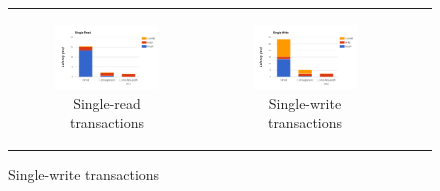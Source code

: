 \begin{figure}
  \centering
  \begin{tabular}{cccc}
    
  \begin{subfigure}[t]{0.4\textwidth}
	\includegraphics[width=\textwidth]{figs/stack-brc.png}
	\caption[]{Single-read transactions}
    \label{fig:stack-brc}
  \end{subfigure} &

  \begin{subfigure}[t]{0.4\textwidth}
	\includegraphics[width=\textwidth]{figs/stack-bwc.png}
	\caption[]{Single-write transactions}
    \label{fig:stack-bwc}
  \end{subfigure} \\


\end{tabular}
\end{figure}
